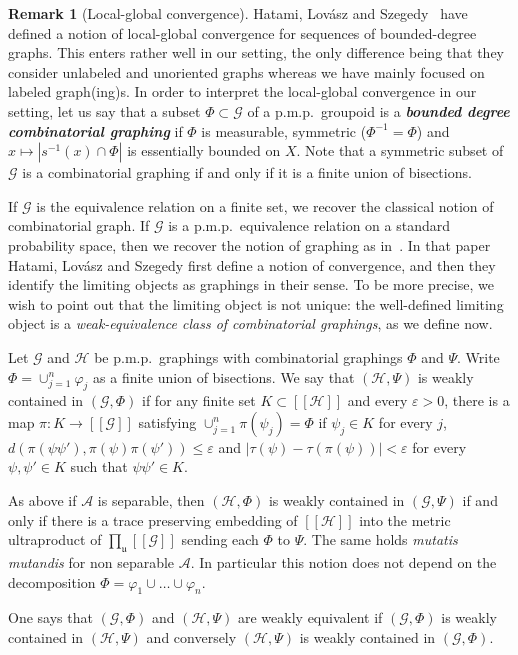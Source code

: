 \documentclass[10pt]{amsart}
\theoremstyle{definition}
\newtheorem{rema}[cdrthm]{Remark}
\newcommand{\defin}[1]{\textbf{\emph{#1}}}
\newcommand{\cH}{\mathcal{H}}
\newcommand{\ch}{\mathcal{H}}
\newcommand{\cg}{\mathcal{G}}
\newcommand{\ra}{\mathscr{A}}
\newcommand{\ul}{\mathfrak{u}}
\newcommand{\eps}{\varepsilon}
\newcommand{\ph}{\varphi}
\newcommand{\pmp}{p.m.p.\ }
\begin{document}
\begin{rema}[Local-global convergence]\label{rem: local-global cv}
Hatami, Lovász and Szegedy~\cite{HatLovSze} have defined a notion of local-global convergence for sequences of bounded-degree graphs. This enters rather well in our setting, the only difference being that they consider unlabeled and unoriented graphs whereas we have mainly focused on labeled graph(ing)s. In order to interpret the local-global convergence in our setting, let us say that a subset $\Phi \subset \cg$ of a \pmp groupoid is a
\defin{bounded degree combinatorial graphing} if $\Phi$ is measurable, symmetric ($\Phi^{-1} = \Phi$) and $x \mapsto |s^{-1}(x) \cap \Phi|$ is essentially bounded on $X$. Note that a symmetric subset of $\cg$ is a combinatorial graphing if and only if it is a finite union of bisections.

If $\cg$ is the equivalence relation on a finite set, we recover the classical notion of combinatorial graph. If $\cg$ is a \pmp equivalence relation on a standard probability space, then we recover the notion of graphing as in~\cite{Kechris-Miller}. In that paper Hatami, Lovász and Szegedy first define a notion of convergence, and then they identify the limiting objects as graphings in their sense. To be more precise, we wish to point out that the limiting object is not unique: the well-defined limiting object is a \emph{weak-equivalence class of combinatorial graphings}, as we define now.

Let $\cg$ and $\ch$ be \pmp graphings with combinatorial graphings $\Phi$ and $\Psi$. Write $\Phi = \cup_{j=1}^n \ph_j$ as a finite union of bisections. We say that $(\ch,\Psi)$ is weakly contained in $(\cg,\Phi)$ if for any finite set $K \subset [[\cH]]$ and every $\eps>0$, there is a map $\pi \colon K \to [[\cg]]$ satisfying $\cup_{j=1}^n \pi(\psi_j) = \Phi$ if $\psi_j \in K$ for every $j$, $d(\pi(\psi\psi'),\pi(\psi)\pi(\psi')) \leq \eps$ and $|\tau(\psi) - \tau(\pi(\psi))|<\eps$ for every $\psi,\psi' \in K$ such that $\psi\psi' \in K$.

As above if $\ra$ is separable, then $(\ch,\Phi)$ is weakly contained in $(\cg,\Psi)$ if and only if there is a trace preserving embedding of $[[\ch]]$ into the metric ultraproduct of $\prod_\ul [[\cg]]$ sending each $\Phi$ to $\Psi$. The same holds \emph{mutatis mutandis} for non separable $\ra$. In particular this notion does not depend on the decomposition $\Phi = \ph_1\cup\dots\cup \ph_n$.

One says that $(\cg,\Phi)$ and $(\ch,\Psi)$ are weakly equivalent if $(\cg,\Phi)$ is weakly contained in $(\ch,\Psi)$ and conversely $(\ch,\Psi)$ is weakly contained in $(\cg,\Phi)$.


\end{rema}
\end{document}
